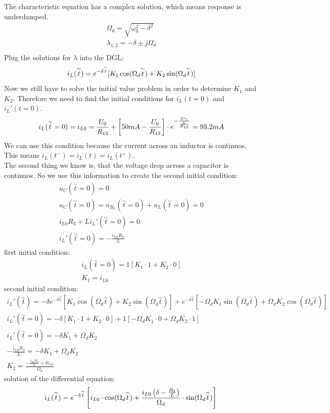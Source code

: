\documentclass[a4paper]{article}
\begin{document}
The characteristic equation has a complex solution, which means response is underdamped.
\begin{align*}
	\Omega_d = \sqrt{\omega_0^2 - \delta^2}\\
	\lambda_{1,2} = -\delta \pm j\Omega_d\\
\end{align*}
Plug the solutions for $\lambda$ into the DGL:
\begin{equation*}
	i_L(\overset{\sim }{t}) = e^{-\delta \overset{\sim }{t}}[K_1\cos(\Omega_d\overset{\sim }{t}) + K_2\sin(\Omega_d\overset{\sim }{t})]\\
\end{equation*}
Now we still have to solve the initial value problem in order to determine $K_1$ and $K_2$.
Therefore we need to find the initial conditions for $i_L(t = 0)$ and $i_L'(t = 0)$.
\begin{equation*}
	i_L(\overset{\sim }{t} = 0) = i_{L0} = \frac{U_0}{R_{13}} + \left[50mA - \frac{U_0}{R_{13}} \right] \cdot e^{-\frac{2\tau_1}{\frac{L}{R_{13}}}} = 93.2mA\\
\end{equation*}
We can use this condition because the current across an inductor is continuos. This means $i_L(t^-) = i_L(t) = i_L(t^+)$.\\
\pagebreak
The second thing we know is, that the voltage drop across a capacitor is continuos. So we use this information to create the second initial condition:
\begin{align*}
	u_C(\overset{\sim }{t} = 0) = 0\\
	u_C(\overset{\sim }{t} = 0) = u_{R_3}(\overset{\sim }{t} = 0) + u_L(\overset{\sim }{t} = 0) = 0\\
	i_{L0}R_3 + Li_L'(\overset{\sim }{t} = 0) = 0\\
	i_L'(\overset{\sim }{t} = 0) = -\frac{i_{L0}R_3}{L}
\end{align*}
first initial condition:
\begin{align*}
	i_L(\overset{\sim }{t} = 0) = 1[K_1 \cdot 1 + K_2\cdot 0]\\
	K_1 = i_{L0}
\end{align*}
second initial condition:
\begin{align*}
	i_L'(\overset{\sim }{t}) = -\delta e^{-\delta \overset{\sim }{t}}[K_1\cos(\Omega_d\overset{\sim }{t}) + K_2\sin(\Omega_d\overset{\sim }{t})] +
	 e^{-\delta \overset{\sim }{t}}[-\Omega_dK_1\sin(\Omega_d\overset{\sim }{t}) + \Omega_dK_2\cos(\Omega_d\overset{\sim }{t})]\\
	i_L'(\overset{\sim }{t}=0) = -\delta [K_1 \cdot 1 + K_2 \cdot 0] + 1[-\Omega_dK_1\cdot 0 + \Omega_dK_2\cdot 1]\\
	i_L'(\overset{\sim }{t}=0) = -\delta K_1 + \Omega_dK_2\\
	-\frac{i_{L0}R_3}{L} = -\delta K_1 + \Omega_dK_2\\
	K_2 = \frac{-\frac{i_{L0}R_3}{L} + \delta i_{L0}}{\Omega_d}
\end{align*}
solution of the differential equation:
\begin{equation*}
	i_L(\overset{\sim }{t}) = e^{-\delta \overset{\sim }{t}} \left[i_{L0} \cdot \cos(\Omega_d\overset{\sim }{t}) + \frac{i_{L0} \left(\delta - \frac{R_3}{L} \right)}{\Omega_d} \cdot \sin(\Omega_d\overset{\sim }{t}) \right]\\
\end{equation*}
\end{document}
